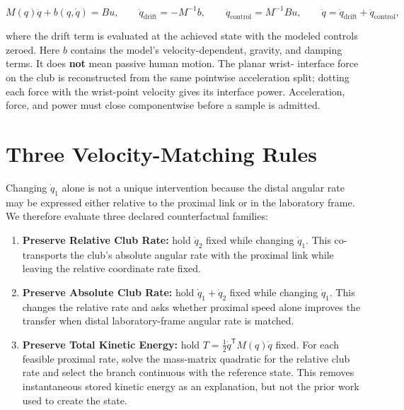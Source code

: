\documentclass[
  letterpaper,
]{report}
\providecommand{\tightlist}{%
  \setlength{\itemsep}{0pt}\setlength{\parskip}{0pt}}
\begin{document}
\[
M(q)\ddot q + b(q,\dot q)=B u,
\qquad
\ddot q_{\mathrm{drift}}=-M^{-1}b,
\qquad
\ddot q_{\mathrm{control}}=M^{-1}Bu,
\qquad
\ddot q = \ddot q_{\mathrm{drift}} + \ddot q_{\mathrm{control}},
\]

where the drift term is evaluated at the achieved state with the modeled
controls zeroed. Here \(b\) contains the model's velocity-dependent,
gravity, and damping terms. It does \textbf{not} mean passive human
motion. The planar wrist- interface force on the club is reconstructed
from the same pointwise acceleration split; dotting each force with the
wrist-point velocity gives its interface power. Acceleration, force, and
power must close componentwise before a sample is admitted.

\section{Three Velocity-Matching
Rules}\label{three-velocity-matching-rules}

Changing \(\dot q_1\) alone is not a unique intervention because the
distal angular rate may be expressed either relative to the proximal
link or in the laboratory frame. We therefore evaluate three declared
counterfactual families:

\begin{enumerate}
\def\labelenumi{\arabic{enumi}.}
\tightlist
\item
  \textbf{Preserve Relative Club Rate:} hold \(\dot q_2\) fixed while
  changing \(\dot q_1\). This co-transports the club's absolute angular
  rate with the proximal link while leaving the relative coordinate rate
  fixed.
\item
  \textbf{Preserve Absolute Club Rate:} hold \(\dot q_1+\dot q_2\) fixed
  while changing \(\dot q_1\). This changes the relative rate and asks
  whether proximal speed alone improves the transfer when distal
  laboratory-frame angular rate is matched.
\item
  \textbf{Preserve Total Kinetic Energy:} hold
  \(T=\tfrac12\dot q^\mathsf{T}M(q)\dot q\) fixed. For each feasible
  proximal rate, solve the mass-matrix quadratic for the relative club
  rate and select the branch continuous with the reference state. This
  removes instantaneous stored kinetic energy as an explanation, but not
  the prior work used to create the state.
\end{enumerate}
\end{document}
